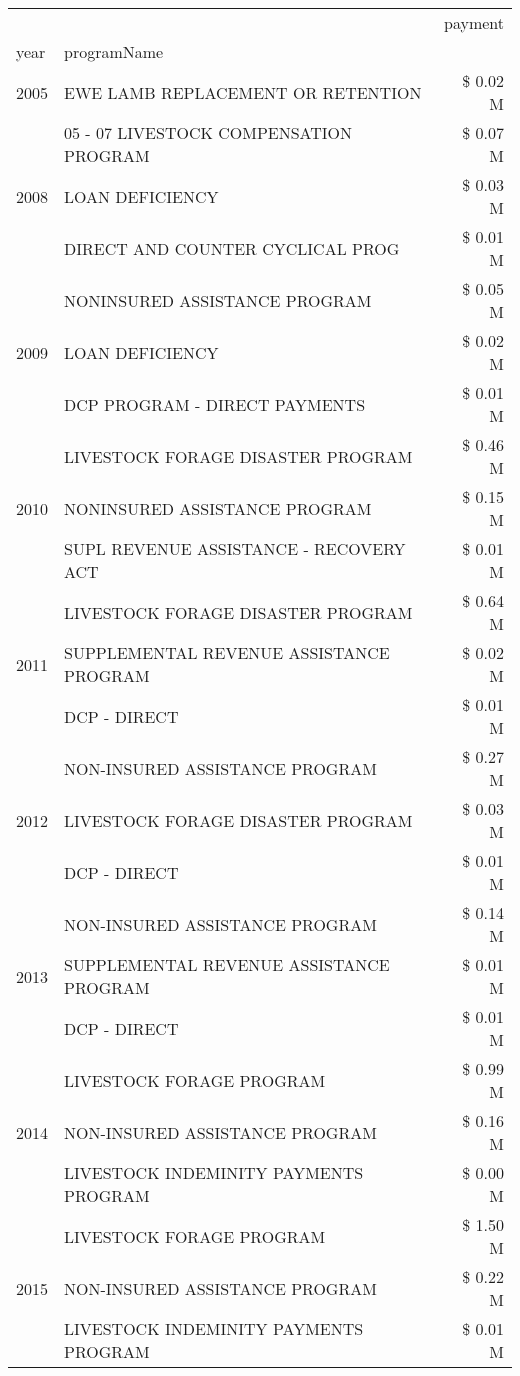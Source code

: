 \begin{tabular}{llr}
\toprule
 &  & payment \\
year & programName &  \\
\midrule
2005 & EWE LAMB REPLACEMENT OR RETENTION & \$ 0.02 M \\
\cline{1-3}
\multirow[t]{3}{*}{2008} & 05 - 07 LIVESTOCK COMPENSATION PROGRAM & \$ 0.07 M \\
 & LOAN DEFICIENCY & \$ 0.03 M \\
 & DIRECT AND COUNTER CYCLICAL PROG & \$ 0.01 M \\
\cline{1-3}
\multirow[t]{3}{*}{2009} & NONINSURED ASSISTANCE PROGRAM & \$ 0.05 M \\
 & LOAN DEFICIENCY & \$ 0.02 M \\
 & DCP PROGRAM - DIRECT PAYMENTS & \$ 0.01 M \\
\cline{1-3}
\multirow[t]{3}{*}{2010} & LIVESTOCK FORAGE DISASTER PROGRAM & \$ 0.46 M \\
 & NONINSURED ASSISTANCE PROGRAM & \$ 0.15 M \\
 & SUPL REVENUE ASSISTANCE - RECOVERY ACT & \$ 0.01 M \\
\cline{1-3}
\multirow[t]{3}{*}{2011} & LIVESTOCK FORAGE DISASTER PROGRAM & \$ 0.64 M \\
 & SUPPLEMENTAL REVENUE ASSISTANCE PROGRAM & \$ 0.02 M \\
 & DCP - DIRECT & \$ 0.01 M \\
\cline{1-3}
\multirow[t]{3}{*}{2012} & NON-INSURED ASSISTANCE PROGRAM & \$ 0.27 M \\
 & LIVESTOCK FORAGE DISASTER PROGRAM & \$ 0.03 M \\
 & DCP - DIRECT & \$ 0.01 M \\
\cline{1-3}
\multirow[t]{3}{*}{2013} & NON-INSURED ASSISTANCE PROGRAM & \$ 0.14 M \\
 & SUPPLEMENTAL REVENUE ASSISTANCE PROGRAM & \$ 0.01 M \\
 & DCP - DIRECT & \$ 0.01 M \\
\cline{1-3}
\multirow[t]{3}{*}{2014} & LIVESTOCK FORAGE PROGRAM & \$ 0.99 M \\
 & NON-INSURED ASSISTANCE PROGRAM & \$ 0.16 M \\
 & LIVESTOCK INDEMINITY PAYMENTS PROGRAM & \$ 0.00 M \\
\cline{1-3}
\multirow[t]{3}{*}{2015} & LIVESTOCK FORAGE PROGRAM & \$ 1.50 M \\
 & NON-INSURED ASSISTANCE PROGRAM & \$ 0.22 M \\
 & LIVESTOCK INDEMINITY PAYMENTS PROGRAM & \$ 0.01 M \\

\end{tabular}
